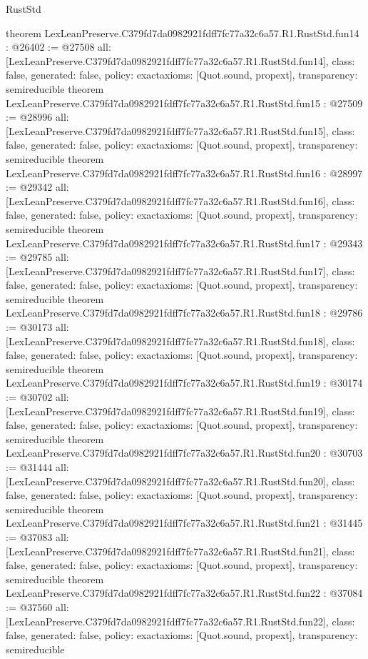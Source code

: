 \begin{lexlean}{RustStd}
\begin{coremodule}
{}
theorem LexLeanPreserve.C379fd7da0982921fdff7fc77a32c6a57.R1.RustStd.fun14 : @26402 := @27508 {
  all: [LexLeanPreserve.C379fd7da0982921fdff7fc77a32c6a57.R1.RustStd.fun14],
  class: false,
  generated: false,
  policy: exact{axioms: [Quot.sound, propext]},
  transparency: semireducible
}
theorem LexLeanPreserve.C379fd7da0982921fdff7fc77a32c6a57.R1.RustStd.fun15 : @27509 := @28996 {
  all: [LexLeanPreserve.C379fd7da0982921fdff7fc77a32c6a57.R1.RustStd.fun15],
  class: false,
  generated: false,
  policy: exact{axioms: [Quot.sound, propext]},
  transparency: semireducible
}
theorem LexLeanPreserve.C379fd7da0982921fdff7fc77a32c6a57.R1.RustStd.fun16 : @28997 := @29342 {
  all: [LexLeanPreserve.C379fd7da0982921fdff7fc77a32c6a57.R1.RustStd.fun16],
  class: false,
  generated: false,
  policy: exact{axioms: [Quot.sound, propext]},
  transparency: semireducible
}
theorem LexLeanPreserve.C379fd7da0982921fdff7fc77a32c6a57.R1.RustStd.fun17 : @29343 := @29785 {
  all: [LexLeanPreserve.C379fd7da0982921fdff7fc77a32c6a57.R1.RustStd.fun17],
  class: false,
  generated: false,
  policy: exact{axioms: [Quot.sound, propext]},
  transparency: semireducible
}
theorem LexLeanPreserve.C379fd7da0982921fdff7fc77a32c6a57.R1.RustStd.fun18 : @29786 := @30173 {
  all: [LexLeanPreserve.C379fd7da0982921fdff7fc77a32c6a57.R1.RustStd.fun18],
  class: false,
  generated: false,
  policy: exact{axioms: [Quot.sound, propext]},
  transparency: semireducible
}
theorem LexLeanPreserve.C379fd7da0982921fdff7fc77a32c6a57.R1.RustStd.fun19 : @30174 := @30702 {
  all: [LexLeanPreserve.C379fd7da0982921fdff7fc77a32c6a57.R1.RustStd.fun19],
  class: false,
  generated: false,
  policy: exact{axioms: [Quot.sound, propext]},
  transparency: semireducible
}
theorem LexLeanPreserve.C379fd7da0982921fdff7fc77a32c6a57.R1.RustStd.fun20 : @30703 := @31444 {
  all: [LexLeanPreserve.C379fd7da0982921fdff7fc77a32c6a57.R1.RustStd.fun20],
  class: false,
  generated: false,
  policy: exact{axioms: [Quot.sound, propext]},
  transparency: semireducible
}
theorem LexLeanPreserve.C379fd7da0982921fdff7fc77a32c6a57.R1.RustStd.fun21 : @31445 := @37083 {
  all: [LexLeanPreserve.C379fd7da0982921fdff7fc77a32c6a57.R1.RustStd.fun21],
  class: false,
  generated: false,
  policy: exact{axioms: [Quot.sound, propext]},
  transparency: semireducible
}
theorem LexLeanPreserve.C379fd7da0982921fdff7fc77a32c6a57.R1.RustStd.fun22 : @37084 := @37560 {
  all: [LexLeanPreserve.C379fd7da0982921fdff7fc77a32c6a57.R1.RustStd.fun22],
  class: false,
  generated: false,
  policy: exact{axioms: [Quot.sound, propext]},
  transparency: semireducible
}
\end{coremodule}
\end{lexlean}
